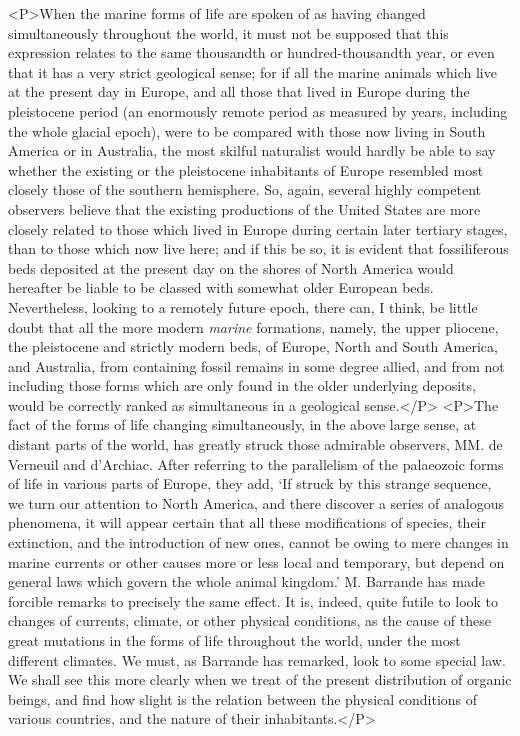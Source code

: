 <P>When the marine forms of life are spoken of as having changed simultaneously throughout the world, it must not be supposed that this expression relates to the same thousandth or hundred-thousandth year, or even that it has a very strict geological sense; for if all the marine animals which live at the present day in Europe, and all those that lived in Europe during the pleistocene period (an enormously remote period as measured by years, including the whole glacial epoch), were to be compared with those now living in South America or in Australia, the most skilful naturalist would hardly be able to say whether the existing or the pleistocene inhabitants of Europe resembled most closely those of the southern hemisphere.  So, again, several highly competent observers believe that the existing productions of the United States are more closely related to those which lived in Europe during certain later tertiary stages, than to those which now live here; and if this be so, it is evident that fossiliferous beds deposited at the present day on the shores of North America would hereafter be liable to be classed with somewhat older European beds. Nevertheless, looking to a remotely future epoch, there can, I think, be little doubt that all the more modern \emph{marine} formations, namely, the upper pliocene, the pleistocene and strictly modern beds, of Europe, North and South America, and Australia, from containing fossil remains in some degree allied, and from not including those forms which are only found in the older underlying deposits, would be correctly ranked as simultaneous in a geological sense.</P>
<P>The fact of the forms of life changing simultaneously, in the above large sense, at distant parts of the world, has greatly struck those admirable observers, MM. de Verneuil and d'Archiac. After referring to the parallelism of the palaeozoic forms of life in various parts of Europe, they add, `If struck by this strange sequence, we turn our attention to North America, and there discover a series of analogous phenomena, it will appear certain that all these modifications of species, their extinction, and the introduction of new ones, cannot be owing to mere changes in marine currents or other causes more or less local and temporary, but depend on general laws which govern the whole animal kingdom.' M. Barrande has made forcible remarks to precisely the same effect. It is, indeed, quite futile to look to changes of currents, climate, or other physical conditions, as the cause of these great mutations in the forms of life throughout the world, under the most different climates. We must, as Barrande has remarked, look to some special law. We shall see this more clearly when we treat of the present distribution of organic beings, and find how slight is the relation between the physical conditions of various countries, and the nature of their inhabitants.</P>
